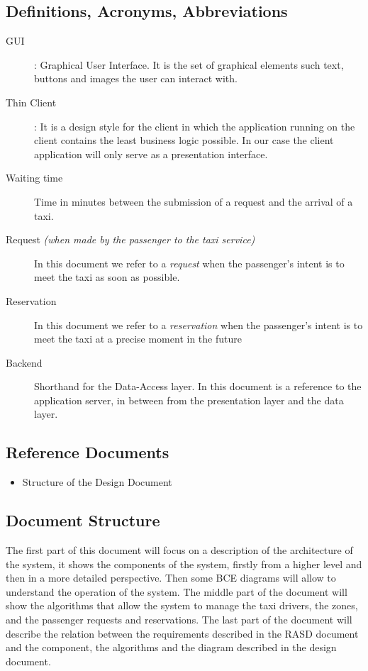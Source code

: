 \documentclass[11pt, a4paper,titlepage]{article}
\begin{document}
\subsection{Definitions, Acronyms, Abbreviations}
\begin{description}
	\item[GUI]: Graphical User Interface. It is the set of graphical elements such text, buttons and images the user can interact with.
	\item[Thin Client]: It is a design style for the client in which the application running on the client contains the least business logic possible. In our case the client application will only serve as a presentation interface.
		\item[Waiting time] \label{itm:Desc_WaitingTime} Time in minutes between the submission of a request and the arrival of a taxi.
		\item[Request \textit{(when made by the passenger to the taxi service)}] \label{Itm:Desc_Request} In this document we refer to a \textit{request} when the passenger's intent is to meet the taxi as soon as possible.
		\item[Reservation] \label{Itm:Desc_Reservation} In this document we refer to a \textit{reservation} when the passenger's intent is to meet the taxi at a precise moment in the future
		\item[Backend] Shorthand for the Data-Access layer. In this document is a reference to the application server, in between from the presentation layer and the data layer.
\end{description}
\subsection{Reference Documents}
	\begin{itemize}
		\item Structure of the Design Document
	\end{itemize}
\subsection{Document Structure}
The first part of this document will focus on a description of the architecture of the system, it shows the components of the system, firstly from a higher level and then in a more detailed perspective. Then some BCE diagrams will allow to understand the operation of the system.
The middle part of the document will show the algorithms that allow the system to manage the taxi drivers, the zones, and the passenger requests and reservations.
The last part of the document will describe the relation between the requirements described in the RASD document and the component, the algorithms and the diagram described in the design document.
\end{document}
